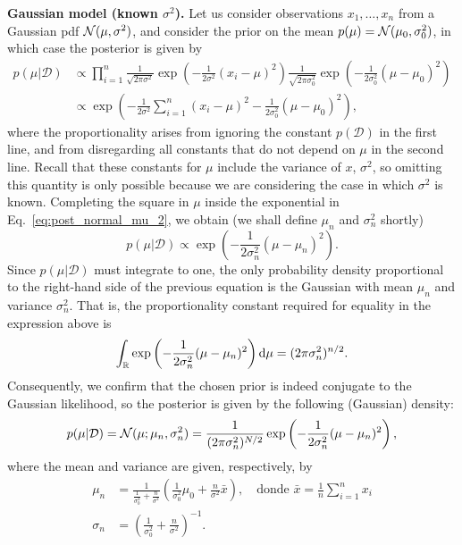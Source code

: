 \begin{example} \textbf{Gaussian model (known $\sigma^2$).} Let us consider observations $x_1,\ldots,x_n$ from a Gaussian pdf ${\mathcal N}(\mu,\sigma^2)$, and consider the prior on the mean $p(\mu) = {\mathcal N}(\mu_0,\sigma_0^2)$, in which case the posterior is given by
 \begin{align}
 	p(\mu|\mathcal{D}) &\propto \prod_{i=1}^n \frac{1}{\sqrt{2\pi\sigma^2}}\exp\left(-\frac{1}{2\sigma^2}(x_i-\mu)^2\right) \frac{1}{\sqrt{2\pi\sigma_0^2}}\exp\left(-\frac{1}{2\sigma_0^2}(\mu-\mu_0)^2\right)\label{eq:post_normal_mu_1}\\
 	&\propto \exp\left(-\frac{1}{2\sigma^2}\sum_{i=1}^n(x_i-\mu)^2-\frac{1}{2\sigma_0^2}(\mu-\mu_0)^2\right),\label{eq:post_normal_mu_2}
 \end{align} 
 where the proportionality arises from ignoring the constant $p(\mathcal{D})$ in the first line, and from disregarding all constants that do not depend on $\mu$ in the second line. Recall that these constants for $\mu$ include the variance of $x$, $\sigma^2$, so omitting this quantity is only possible because we are considering the case in which $\sigma^2$ is known. Completing the square in $\mu$ inside the exponential in Eq.~\eqref{eq:post_normal_mu_2}, we obtain (we shall define $\mu_n$ and $\sigma_n^2$ shortly) 
 \begin{equation}
 	p(\mu|\mathcal{D}) \propto \exp\left(-\frac{1}{2\sigma_n^2}(\mu - \mu_n)^2\right).\label{eq:post_normal_mu_3}
 \end{equation} 
Since $p(\mu|\mathcal{D})$ must integrate to one, the only probability density proportional to the right-hand side of the previous equation is the Gaussian with mean $\mu_n$ and variance $\sigma_n^2$. That is, the proportionality constant required for equality in the expression above is
 \begin{equation}
     \int_{\mathbb{R}}\exp\left(-\frac{1}{2\sigma_n^2}(\mu - \mu_n)^2\right){\text d}\mu = (2\pi\sigma_n^2)^{n/2}.
 \end{equation} 
 Consequently, we confirm that the chosen prior is indeed conjugate to the Gaussian likelihood, so the posterior is given by the following (Gaussian) density:
  \begin{equation}
 	p(\mu|\mathcal{D}) = {\mathcal N}(\mu;\mu_n,\sigma_n^2) = \frac{1}{(2\pi\sigma_n^2)^{N/2}}\exp\left(-\frac{1}{2\sigma_n^2}(\mu - \mu_n)^2\right),\label{eq:post_normal_mu_4}
 \end{equation} 
where the mean and variance are given, respectively, by
 \begin{align}
 	\mu_n &= \frac{1}{\tfrac{1}{\sigma_0^2} + \tfrac{n}{\sigma^2}} \left(\frac{1}{\sigma_0^2}\mu_0 + \frac{n}{\sigma^2}\bar{x} \right), \quad \text{donde } \bar{x} = \frac{1}{n}\sum_{i=1}^n x_i\label{eq:post_Gm}\\
 	\sigma_n &= \left(\frac{1}{\sigma_0^2} + \frac{n}{\sigma^2}\right)^{-1}.\label{eq:post_Gv}
 \end{align}
\end{example}

